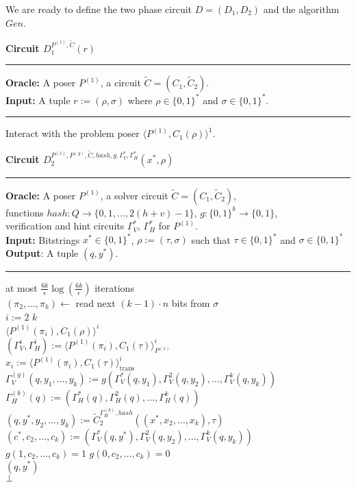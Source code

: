 %
We are ready to define the two phase circuit $D = (D_1, D_2)$ and the algorithm $Gen$.
%
\begin{codeblock}
  \textbf{Circuit $D_1^{P^{(1)}, \widetilde{C}}(r)$}
  \medskip \hrule \medskip
  \textbf{Oracle:} A poser $P^{(1)}$, a circuit $\widetilde{C} = (C_1, \widetilde{C}_2)$.\\
  \textbf{Input:} A tuple $r := (\rho, \sigma)$ where $ \rho \in \{0,1\}^{*}$ and $\sigma \in \{0,1\}^{*}$.
  \medskip\hrule\medskip
  Interact with the problem poser $\langle P^{(1)}, C_1(\rho) \rangle^1$.
\end{codeblock}
%
\begin{codeblock}
  \textbf{Circuit $D_2^{P^{(1)}, P^{(g)}, \widetilde{C}, hash, g, \Gamma_V^*, \Gamma_H^*}(x^*, \rho)$}
  \medskip \hrule \medskip
  \textbf{Oracle:} A poser $P^{(1)}$, a solver circuit $\widetilde{C} = (C_1, \widetilde{C}_2)$, \\
  \IndII functions $hash : Q \rightarrow \{0,1, \dots, 2(h+v)-1\}$, $g:\{0,1\}^k \rightarrow \{0,1\}$, \\
  \IndII verification and hint circuits $\Gamma_V^*$, $\Gamma_H^*$ for $P^{(1)}$. \\
  \textbf{Input:} Bitstrings $x^* \in \{0,1\}^{*}$, $\rho := (\tau, \sigma)$ such that $\tau \in \{0,1\}^{*}$ and $\sigma \in \{0,1\}^{*}$\\
  \textbf{Output}: A tuple $(q, y^*)$.
  \medskip \hrule \medskip
  \For at most $\frac{6k}{\epsilon} \log(\frac{6k}{\epsilon})$ iterations \Do \\
  \IndI $(\pi_2, \dots, \pi_k) \leftarrow$ read next $(k-1)\cdot n$ bits from $\sigma$ \\
  \IndI \For $i:=2$ \To $k$ \Do \\
  \IndII \Run $\langle P^{(1)}(\pi_i), C_1(\rho)\rangle^i$ \\
  \IndIII $(\Gamma_V^{i}, \Gamma_H^{i}) := \langle P^{(1)}(\pi_i), C_1(\tau) \rangle^i_{P^{(1)}}$ \\
  \IndIII $x_i := \langle P^{(1)}(\pi_i), C_1(\tau) \rangle^i_{\text{trans}}$ \\
  \IndI $\Gamma_V^{(g)}(q, y_1, \dots, y_k) := g(\Gamma_V^{*}(q,y_1), \Gamma_V^{2}(q,y_2), \dots, \Gamma_V^{k}(q, y_k))$  \\
  \IndI $\Gamma_H^{(k)}(q) := (\Gamma_H^{*}(q), \Gamma_H^{2}(q), \dots, \Gamma_H^{k}(q))$ \\
  \IndI $(q, y^*, y_2, \dots, y_k) := \widetilde{C}_2^{\Gamma_H^{(k)}, hash}((x^*, x_2, \dots, x_k), \tau)$\\
  \IndI $(c^*, c_2, \dots, c_k) := (\Gamma_V^*(q, y^*), \Gamma_V^2(q, y_2), \dots, \Gamma_V^{k}(q, y_k))$ \\
  \IndI \If $g(1, c_{2}, \dots, c_k) = 1$ \And $g(0,c_{2}, \dots, c_k) = 0$ \Then \\
  \IndII \Return $(q, y^*)$ \\
  \Return $\bot$
%
\end{codeblock}
